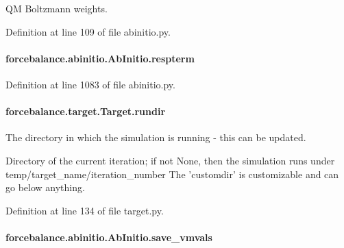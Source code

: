 Q\-M Boltzmann weights. 



Definition at line 109 of file abinitio.\-py.

\hypertarget{classforcebalance_1_1abinitio_1_1AbInitio_a689e3849518b33539442a473a41ed32d}{
\paragraph[{respterm}]{\setlength{\rightskip}{0pt plus 5cm}forcebalance.\-abinitio.\-Ab\-Initio.\-respterm\hspace{0.3cm}{\ttfamily [inherited]}}}\label{classforcebalance_1_1abinitio_1_1AbInitio_a689e3849518b33539442a473a41ed32d}


Definition at line 1083 of file abinitio.\-py.

\hypertarget{classforcebalance_1_1target_1_1Target_a6872de5b2d4273b82336ea5b0da29c9e}{
\paragraph[{rundir}]{\setlength{\rightskip}{0pt plus 5cm}forcebalance.\-target.\-Target.\-rundir\hspace{0.3cm}{\ttfamily [inherited]}}}\label{classforcebalance_1_1target_1_1Target_a6872de5b2d4273b82336ea5b0da29c9e}


The directory in which the simulation is running -\/ this can be updated. 

Directory of the current iteration; if not None, then the simulation runs under temp/target\-\_\-name/iteration\-\_\-number The 'customdir' is customizable and can go below anything.

Definition at line 134 of file target.\-py.

\hypertarget{classforcebalance_1_1abinitio_1_1AbInitio_a22037bf43728fa45f387390005e0b131}{
\paragraph[{save\-\_\-vmvals}]{\setlength{\rightskip}{0pt plus 5cm}forcebalance.\-abinitio.\-Ab\-Initio.\-save\-\_\-vmvals\hspace{0.3cm}{\ttfamily [inherited]}}}\label{classforcebalance_1_1abinitio_1_1AbInitio_a22037bf43728fa45f387390005e0b131}


